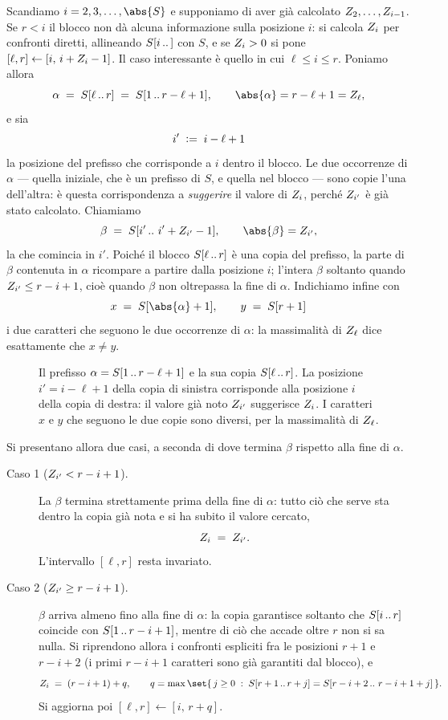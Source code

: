 Scandiamo $i=2,3,\dots,\abs{S}$ e supponiamo di aver già calcolato
$Z_{2},\dots,Z_{i-1}$. Se $r<i$ il blocco non dà alcuna informazione sulla
posizione $i$: si calcola $Z_{i}$ per confronti diretti, allineando $S[i\,..\,]$
con $S$, e se $Z_{i}>0$ si pone $[\ell,r]\leftarrow[i,\,i+Z_{i}-1]$. Il caso
interessante è quello in cui $\ell \le i \le r$. Poniamo allora
\[
  \alpha \;=\; \sub{S}{\ell}{r}\;=\;\pre{S}{r-\ell+1},
  \qquad \abs{\alpha}=r-\ell+1=\Zv{\ell},
\]
e sia
\[
  i' \;\vcentcolon=\; i-\ell+1
\]
la posizione del prefisso che corrisponde a $i$ dentro il blocco. Le due
occorrenze di $\alpha$ --- quella iniziale, che è un prefisso di $S$, e quella nel
blocco --- sono copie l'una dell'altra: è questa corrispondenza a \emph{suggerire}
il valore di $Z_{i}$, perché $Z_{i'}$ è già stato calcolato. Chiamiamo
\[
  \beta\;=\;\sub{S}{i'}{\,i'+\Zv{i'}-1},
  \qquad \abs{\beta}=\Zv{i'},
\]
la \Zbox che comincia in $i'$. Poiché il blocco $S[\ell\,..\,r]$ è una copia del
prefisso, la parte di $\beta$ contenuta in $\alpha$ ricompare a partire dalla
posizione $i$; l'intera $\beta$ soltanto quando $Z_{i'}\le r-i+1$, cioè quando
$\beta$ non oltrepassa la fine di $\alpha$. Indichiamo infine con
\[
  x \;=\; S[\abs{\alpha}+1], \qquad y \;=\; S[r+1]
\]
i due caratteri che seguono le due occorrenze di $\alpha$: la massimalità di
$Z_{\ell}$ dice esattamente che $x\neq y$.

\begin{figure}[H]
  \centering
  
  \caption{Il prefisso $\alpha=S[1\,..\,r-\ell+1]$ e la sua copia
  $S[\ell\,..\,r]$. La posizione $i'=i-\ell+1$ della copia di sinistra
  corrisponde alla posizione $i$ della copia di destra: il valore già noto
  $Z_{i'}$ suggerisce $Z_{i}$. I caratteri $x$ e $y$ che seguono le due copie
  sono diversi, per la massimalità di $Z_{\ell}$.}
  \label{fig:z-alfa-beta}
\end{figure}

\noindent Si presentano allora due casi, a seconda di dove termina $\beta$
rispetto alla fine di $\alpha$.

\begin{description}
  \item[Caso 1 \textnormal{($Z_{i'}<r-i+1$).}] La \Zbox $\beta$ termina
    strettamente prima della fine di $\alpha$: tutto ciò che serve sta dentro la
    copia già nota e si ha subito il valore cercato,
    \[
      Z_{i}\;=\;Z_{i'} .
    \]
    L'intervallo $[\ell,r]$ resta invariato.
  \item[Caso 2 \textnormal{($Z_{i'}\ge r-i+1$).}] $\beta$ arriva almeno fino
    alla fine di $\alpha$: la copia garantisce soltanto che $S[i\,..\,r]$
    coincide con $S[1\,..\,r-i+1]$, mentre di ciò che accade oltre $r$ non si sa
    nulla. Si riprendono allora i confronti espliciti fra le posizioni $r+1$ e
    $r-i+2$ (i primi $r-i+1$ caratteri sono già garantiti dal blocco), e
    \[
      \Zv{i}\;=\;(r-i+1)+q,
      \qquad
      q=\max\set{\,j\ge 0 \;:\; \sub{S}{r+1}{r+j}=\sub{S}{r-i+2}{\,r-i+1+j}\,} .
    \]
    Si aggiorna poi $[\ell,r]\leftarrow[i,\,r+q]$.
\end{description}

